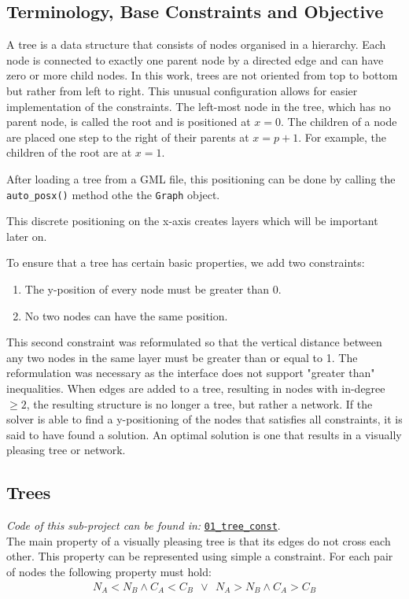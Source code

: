 \documentclass{article}
\begin{document}
\subsection*{Terminology, Base Constraints and Objective}
A tree is a data structure that consists of nodes organised in a hierarchy. Each node is connected to exactly one parent node by a directed edge and can have zero or more child nodes. In this work, trees are not oriented from top to bottom but rather from left to right. This unusual configuration allows for easier implementation of the constraints.
The left-most node in the tree, which has no parent node, is called the root and is positioned at $x = 0$. The children of a node are placed one step to the right of their parents at $x = p + 1$. For example, the children of the root are at $x = 1$.

After loading a tree from a \ac{GML} file, this positioning can be done by calling the \texttt{auto\_posx()} method othe the \texttt{Graph} object.

This discrete positioning on the x-axis creates layers which will be important later on.

To ensure that a tree has certain basic properties, we add two constraints:
\begin{enumerate}
    \item The y-position of every node must be greater than 0.
    \item No two nodes can have the same position.
\end{enumerate}
This second constraint was reformulated so that the vertical distance between any two nodes in the same layer must be greater than or equal to 1. The reformulation was necessary as the interface does not support "greater than" inequalities.
When edges are added to a tree, resulting in nodes with in-degree $\geq 2$, the resulting structure is no longer a tree, but rather a network. If the solver is able to find a y-positioning of the nodes that satisfies all constraints, it is said to have found a solution. An optimal solution is one that results in a visually pleasing tree or network.

\subsection*{Trees}
\textit{Code of this sub-project can be found in: }\href{https://github.com/not-a-feature/Layouting-Phylogenetic-Networks-using-MIQP/tree/main/01_tree_const}{\texttt{01\_tree\_const}}.\\
The main property of a visually pleasing tree is that its edges do not cross each other. This property can be represented using simple a constraint. For each pair of nodes the following property must hold:
\begin{align}
    N_A < N_B \land C_A < C_B~ ~\lor~~ N_A > N_B \land C_A > C_B \label{form:donotcross}
\end{align} 
\end{document}
